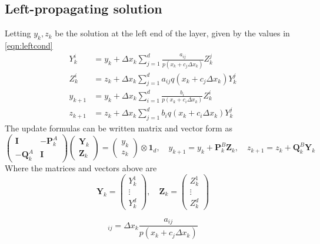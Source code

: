 \documentclass[a4paper,12pt]{article}
\begin{document}
\subsection*{Left-propagating solution}
Letting $y_k,z_k$ be the solution at the left end of the layer, given by the values in 
\eqref{eqn:leftcond}
\begin{equation}
\begin{aligned}
Y_k^i &= y_k + \Delta x_k\sum\limits_{j=1}^d \frac{a_{ij}}{p(x_k+c_j\Delta x_k)}Z_k^j \\
Z_k^i &= z_k + \Delta x_k\sum\limits_{j=1}^d a_{ij}q(x_k+c_j\Delta x_k)Y_k^j \\
y_{k+1} &= y_k + \Delta x_k \sum\limits_{i=1}^d \frac{b_{i}}{p(x_k+c_i\Delta x_k)}Z_k^i \\
z_{k+1} &= z_k + \Delta x_k\sum\limits_{j=1}^d b_{i}q(x_k+c_i\Delta x_k)Y_k^j
\end{aligned}
\end{equation}
The update formulas can be written matrix and vector form as
\begin{equation}
\begin{pmatrix}
\mathbf{I} & -\mathbf{P}_k^A \\
-\mathbf{Q}_k^A & \mathbf{I}
\end{pmatrix}
\begin{pmatrix}
\mathbf{Y}_k \\
\mathbf{Z}_k
\end{pmatrix}
= \begin{pmatrix}
y_k \\
z_k
\end{pmatrix}\otimes\mathbf{1}_d,\quad 
y_{k+1} = y_k+\mathbf{P}_k^B\mathbf{Z}_k,\quad
z_{k+1} = z_k+\mathbf{Q}_k^B\mathbf{Y}_k
\end{equation}
Where the matrices and vectors above are
\begin{equation}
\mathbf{Y}_k = \begin{pmatrix}
Y_k^1 \\ \vdots \\ Y_k^d                
\end{pmatrix},\quad
\mathbf{Z}_k = \begin{pmatrix}
Z_k^1 \\ \vdots \\ Z_k^d                
\end{pmatrix}
\end{equation}


\begin{equation}
[\mathbf{P}_k^A]_{ij} = \Delta x_k\frac{a_{ij}}{p(x_k+c_j\Delta x_k)} 
\end{equation}
\end{document}
